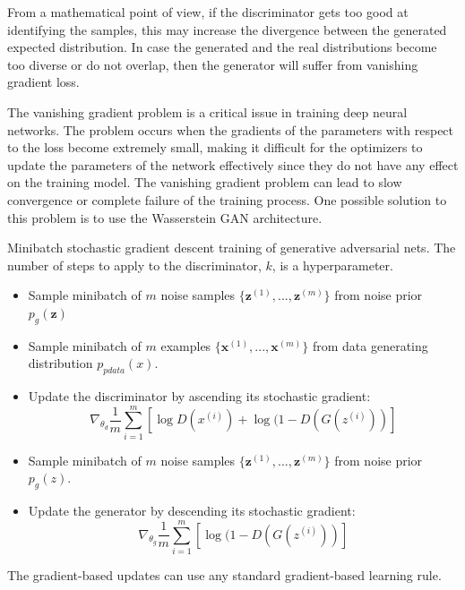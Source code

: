 \noindent From a mathematical point of view, if the discriminator gets too good at identifying the samples, this may increase the divergence between the generated expected distribution. In case the generated and the real distributions become too diverse or do not overlap, then the generator will suffer from vanishing gradient loss.

\noindent The vanishing gradient problem is a critical issue in training deep neural networks. The problem occurs when the gradients of the parameters with respect to the loss become extremely small, making it difficult for the optimizers to update the parameters of the network effectively since they do not have any effect on the training model. The vanishing gradient problem can lead to slow convergence or complete failure of the training process. 
One possible solution to this problem is to use the Wasserstein GAN architecture.\\

\begin{algorithm}
\caption{Minibatch stochastic gradient descent training of generative adversarial nets. The number of steps to apply to the discriminator, $k$, is a hyperparameter.}
\begin{algorithmic}
\label{alg:training optimisation}
         \Statex\begin{itemize}
         \setlength{\itemindent}{.2in}
             \item Sample minibatch of $m$ noise samples $\{ \mathbf{z}^{(1)}, ..., \mathbf{z}^{(m)}\}$ from noise prior $p_g(\mathbf{z})$
             \item Sample minibatch of $m$ examples $\{ \mathbf{x}^{(1)}, ..., \mathbf{x}^{(m)}\}$ from data generating distribution $p_{pdata}(x)$.
             \item Update the discriminator by ascending its stochastic gradient: 
                \begin{equation}
                \label{eq:update rule discriminator}
                    \nabla_{\theta_d}\frac{1}{m}\sum_{i=1}^m [ \log D(x^{(i)}) + \log (1 - D(G(z^{(i)})) ]
                \end{equation}
         \end{itemize}
    \EndFor
    \begin{itemize}
     \setlength{\itemindent}{.2in}
        \item Sample minibatch of $m$ noise samples $\{ \mathbf{z}^{(1)}, ..., \mathbf{z}^{(m)}\}$ from noise prior $p_g(z)$. 
        \item Update the generator by descending its stochastic gradient:
        \begin{equation}
        \label{eq:update rule generator}
            \nabla_{\theta_g}\frac{1}{m}\sum_{i=1}^m [ \log (1 - D(G(z^{(i)})) ]
        \end{equation}
    \end{itemize}
\EndFor
\end{algorithmic}
The gradient-based updates can use any standard gradient-based learning rule.
\end{algorithm}

